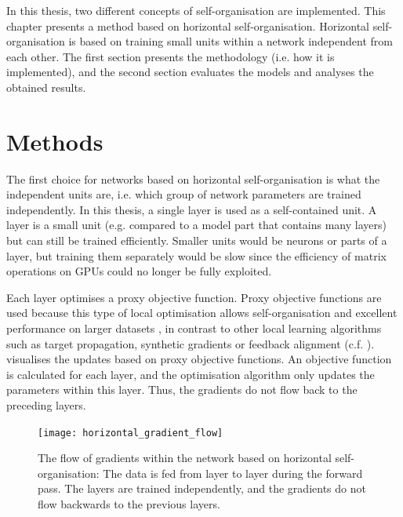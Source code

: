 In this thesis, two different concepts of self-organisation are implemented.
This chapter presents a method based on horizontal self-organisation.
Horizontal self-organisation is based on training small units within a network independent from each other.
The first section presents the methodology (i.e. how it is implemented), and the second section evaluates the models and analyses the obtained results.


\section{Methods}
The first choice for networks based on horizontal self-organisation is what the independent units are, i.e. which group of network parameters are trained independently.
In this thesis, a single layer is used as a self-contained unit. A layer is a small unit (e.g. compared to a model part that contains many layers) but can still be trained efficiently.
Smaller units would be neurons or parts of a layer, but training them separately would be slow since the efficiency of matrix operations on GPUs could no longer be fully exploited.

Each layer optimises a proxy objective function.
Proxy objective functions are used because this type of local optimisation allows self-organisation and excellent performance on larger datasets , in contrast to other local learning algorithms such as target propagation, synthetic gradients or feedback alignment (c.f. ). 
  visualises the updates based on proxy objective functions.
An objective function is calculated for each layer, and the optimisation algorithm only updates the parameters within this layer.
Thus, the gradients do not flow back to the preceding layers.

\begin{figure}[h]
    \centering
    \texttt{[image: horizontal\_gradient\_flow]}
    \caption[The flow of gradients within the network based on horizontal self-organisation]{The flow of gradients within the network based on horizontal self-organisation: The data is fed from layer to layer during the forward pass. The layers are trained independently, and the gradients do not flow backwards to the previous layers.}
\end{figure}

